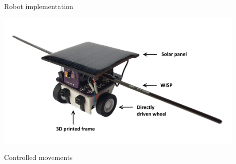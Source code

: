 \documentclass{beamer}
\begin{document}
\begin{frame}{Robot implementation}
	\begin{center}
		\includegraphics[width=0.9\textwidth]{pics/tp_robot2.png}
	\end{center}
\end{frame}

\begin{frame}{Controlled movements}

\end{frame}
\end{document}
